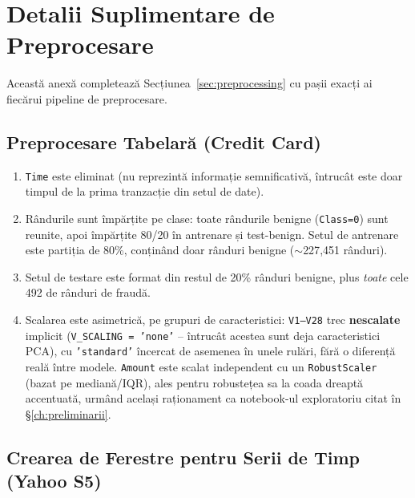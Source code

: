 \chapter{Detalii Suplimentare de Preprocesare}
\label{sec:preprocessing-details}

Această anexă completează Secțiunea~\ref{sec:preprocessing} cu pașii exacți ai fiecărui pipeline de preprocesare.

\section{Preprocesare Tabelară (Credit Card)}

\begin{enumerate}
  \item \texttt{Time} este eliminat (nu reprezintă informație semnificativă, întrucât este doar timpul de la prima tranzacție din setul de date).
  \item Rândurile sunt împărțite pe clase: toate rândurile benigne (\texttt{Class=0}) sunt reunite, apoi împărțite 80/20 în antrenare și test-benign. Setul de antrenare este partiția de 80\%, conținând doar rânduri benigne ($\sim$227{,}451 rânduri).
  \item Setul de testare este format din restul de 20\% rânduri benigne, plus \emph{toate} cele 492 de rânduri de fraudă.
  \item Scalarea este asimetrică, pe grupuri de caracteristici: \texttt{V1--V28} trec \textbf{nescalate} implicit (\texttt{V\_SCALING = 'none'} -- întrucât acestea sunt deja caracteristici PCA), cu \texttt{'standard'} încercat de asemenea în unele rulări, fără o diferență reală între modele. \texttt{Amount} este scalat independent cu un \texttt{RobustScaler} (bazat pe mediană/IQR), ales pentru robustețea sa la coada dreaptă accentuată, urmând același raționament ca notebook-ul exploratoriu citat în \S\ref{ch:preliminarii}.
\end{enumerate}

\section{Crearea de Ferestre pentru Serii de Timp (Yahoo S5)}

